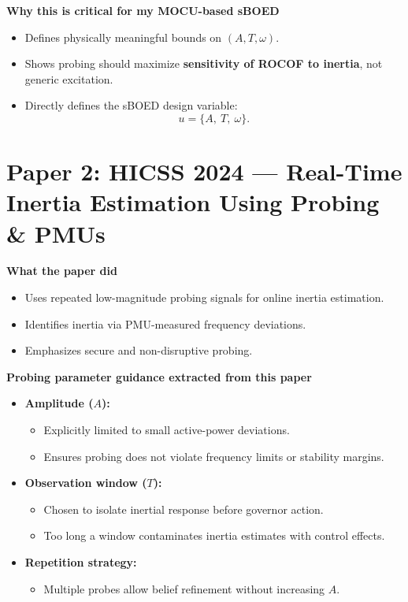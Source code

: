 \documentclass[12pt]{article}
\begin{document}
\textbf{Why this is critical for my MOCU-based sBOED}
\begin{itemize}
  \item Defines physically meaningful bounds on $(A, T, \omega)$.
  \item Shows probing should maximize \textbf{sensitivity of ROCOF to inertia}, not generic excitation.
  \item Directly defines the sBOED design variable:
  \[
  u = \{A,\ T,\ \omega\}.
  \]
\end{itemize}





\newpage
\section*{Paper 2: HICSS 2024 — Real-Time Inertia Estimation Using Probing \& PMUs \cite{yi2024hicss}}

\textbf{What the paper did}
\begin{itemize}
  \item Uses repeated low-magnitude probing signals for online inertia estimation.
  \item Identifies inertia via PMU-measured frequency deviations.
  \item Emphasizes secure and non-disruptive probing.
\end{itemize}

\textbf{Probing parameter guidance extracted from this paper}
\begin{itemize}
  \item \textbf{Amplitude ($A$):}
  \begin{itemize}
    \item Explicitly limited to small active-power deviations.
    \item Ensures probing does not violate frequency limits or stability margins.
  \end{itemize}

  \item \textbf{Observation window ($T$):}
  \begin{itemize}
    \item Chosen to isolate inertial response before governor action.
    \item Too long a window contaminates inertia estimates with control effects.
  \end{itemize}

  \item \textbf{Repetition strategy:}
  \begin{itemize}
    \item Multiple probes allow belief refinement without increasing $A$.
  \end{itemize}
\end{itemize}
\end{document}

